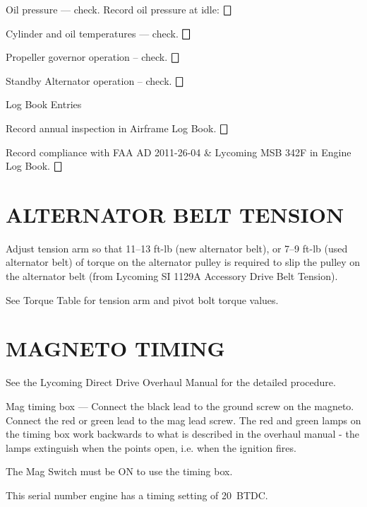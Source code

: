 \begin{enumerate*}
\begin{enumerate*}
		\item Oil pressure --- check. Record oil pressure at idle: \underline{\makebox[0.5in][l]{}} \dotfill $\bigbox$
		\item Cylinder and oil temperatures --- check. \dotfill $\bigbox$
		\item Propeller governor operation -- check. \dotfill $\bigbox$
		\item Standby Alternator operation -- check. \dotfill $\bigbox$
	\end{enumerate*}
	\item{Log Book Entries}
	\begin{enumerate*}
		\item Record annual inspection in Airframe Log Book. \dotfill $\bigbox$
		\item Record compliance with FAA AD 2011-26-04 \& Lycoming MSB 342F in Engine Log Book. \dotfill $\bigbox$
	\end{enumerate*}
\end{enumerate*}

\section{ALTERNATOR BELT TENSION} 
\begin{enumerate*}
	\item Adjust tension arm so that 11--13 ft-lb (new alternator belt), or 7--9 ft-lb (used alternator belt) of torque on the alternator pulley is required to slip the pulley on the alternator belt (from Lycoming SI 1129A Accessory Drive Belt Tension). 
	\item See Torque Table for tension arm and pivot bolt torque values. 
\end{enumerate*}

\section{MAGNETO TIMING} 
\begin{enumerate*}
	\item See the Lycoming Direct Drive Overhaul Manual for the detailed procedure. 
	\item Mag timing box --- Connect the black lead to the ground screw on the magneto.  Connect the red or green lead to the mag lead screw.  The red and green lamps on the timing box work backwards to what is described in the overhaul manual - the lamps extinguish when the points open, i.e. when the ignition fires. 
	\item The Mag Switch must be ON to use the timing box. 
	\item This serial number engine has a timing setting of 20\textdegree ~BTDC. 
	
\end{enumerate*}

